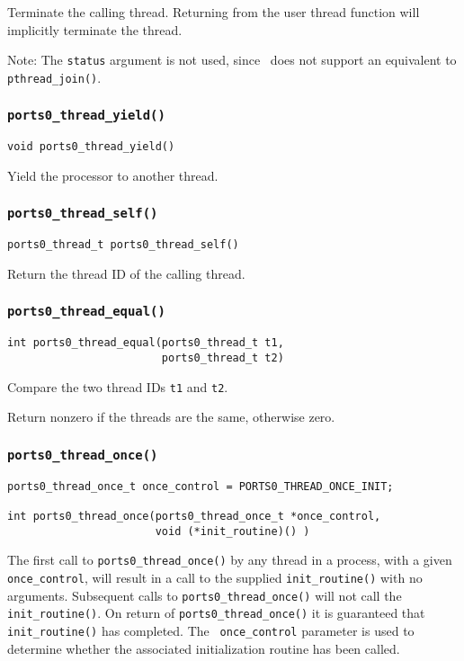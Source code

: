 Terminate the calling thread.  Returning from the user thread function
will implicitly terminate the thread.

Note: The {\tt status} argument is not used, since \portszero\ does not
support an equivalent to {\tt pthread\_join()}.


\subsubsection{\tt ports0\_thread\_yield()}
\begin{verbatim}
void ports0_thread_yield()
\end{verbatim}

Yield the processor to another thread.


\subsubsection{\tt ports0\_thread\_self()}
\begin{verbatim}
ports0_thread_t ports0_thread_self()
\end{verbatim}

Return the thread ID of the calling thread.


\subsubsection{\tt ports0\_thread\_equal()}
\begin{verbatim}
int ports0_thread_equal(ports0_thread_t t1,
                        ports0_thread_t t2)
\end{verbatim}

Compare the two thread IDs {\tt t1} and {\tt t2}. 

Return nonzero if the threads are the same, otherwise zero.


\subsubsection{\tt ports0\_thread\_once()}
\begin{verbatim}
ports0_thread_once_t once_control = PORTS0_THREAD_ONCE_INIT;

int ports0_thread_once(ports0_thread_once_t *once_control,
                       void (*init_routine)() )
\end{verbatim}

The first call to {\tt ports0\_thread\_once()} by any thread in a
process, with a given {\tt once\_control}, will result in a call to
the supplied {\tt init\_routine()} with no arguments.  Subsequent
calls to {\tt ports0\_thread\_once()} will not call the {\tt
init\_routine()}.  On return of {\tt ports0\_thread\_once()} it is
guaranteed that {\tt init\_routine()} has completed.  The {\tt
once\_control} parameter is used to determine whether the associated
initialization routine has been called.

